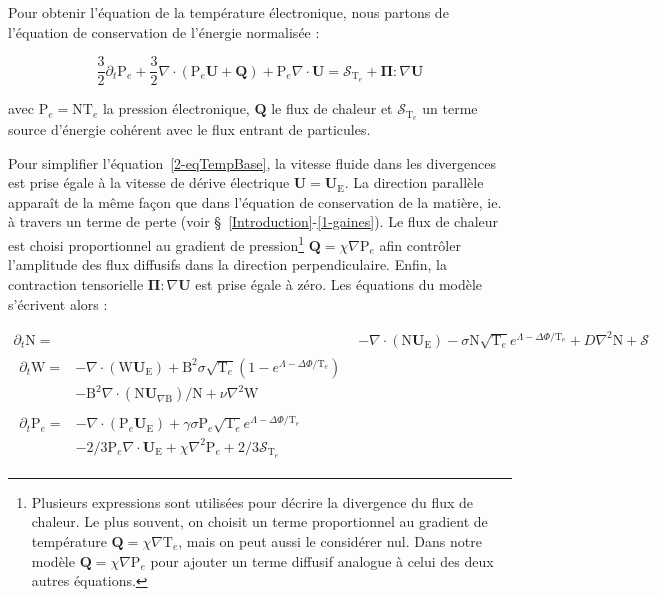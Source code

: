 \begin{refsection}
	Pour obtenir l'équation de la température électronique, nous partons de
	l'équation de conservation de l'énergie normalisée :
	
	\begin{equation} 
	\label{2-eqTempBase}
		\frac{3}{2}\partial_t \text{P}_e +
		\frac{3}{2}\nabla\cdot\left(\text{P}_e\mathbf{U}+\mathbf{Q}\right) +
		\text{P}_e\nabla\cdot\mathbf{U}=\mathcal{S}_{\text{T}_e} +
		\mathbf{\Pi}:\nabla \mathbf U
	\end{equation}
	
	avec $\text{P}_e=\text{NT}_e$ la pression électronique, $\mathbf{Q}$ le
	flux de chaleur et $\mathcal{S}_{\text{T}_e}$ un terme source d'énergie
	cohérent avec le flux entrant de particules. 
	
	Pour simplifier l'équation~\ref{2-eqTempBase}, la vitesse
	fluide dans les divergences est prise égale à la vitesse de dérive électrique $\mathbf
	U=\mathbf U_\text{E}$. La direction parallèle apparaît de la même façon que
	dans l'équation de conservation de la matière, ie. à travers un terme de
	perte (voir \S~\ref{Introduction}-\ref{1-gaines}). Le flux de chaleur est
	choisi proportionnel au gradient de pression\footnote{Plusieurs expressions
	sont utilisées pour décrire la divergence du flux de chaleur. Le plus souvent,
	on choisit un terme proportionnel au gradient de température 
$\mathbf{Q}=\chi\nabla\text{T}_e$, mais on peut aussi le considérer nul. Dans
notre modèle $\mathbf{Q}=\chi\nabla\text{P}_e$ pour ajouter un terme diffusif
analogue à celui des deux autres équations.} $\mathbf{Q}=\chi\nabla\text{P}_e$
afin contrôler l'amplitude des flux diffusifs dans la direction perpendiculaire.
	Enfin, la contraction tensorielle $\mathbf{\Pi}:\nabla \mathbf U$ est
	prise égale à zéro. Les équations du modèle s'écrivent alors :
	
\begin{align}
\label{2-eqContinuiteTemp}
\partial_t \text{N}
=& - \nabla\cdot\left(\text{N}\mathbf U_\text{E}\right) -\sigma
\text{N}\sqrt{\text{T}_e}e^{\Lambda-\Delta\Phi/\text{T}_e} + D\nabla^2 \text{N}
+ \mathcal{S}
\\[0.5cm]
\label{2-eqCourantTemp}
\begin{split}
\partial_{t}\text{W} =& 
-\nabla\cdot\left(\text{W}\mathbf U_\text{E}\right)
+\text{B}^2\sigma\sqrt{\text{T}_e}\left(1-e^{\Lambda-\Delta\Phi/\text{T}_e}\right)\\
&-\text{B}^2\nabla\cdot\left(\text{N}\mathbf
U_{\nabla\text{B}}\right)/\text{N} +\nu\nabla^2\text{W}
\end{split}
\\[0.5cm]
\label{2-eqEnergyTemp}
\begin{split}
\partial_{t}\text{P}_e=&
-\nabla\cdot\left(\text{P}_e\mathbf U_\text{E}\right)
+\gamma\sigma\text{P}_e\sqrt{\text{T}_e}e^{\Lambda-\Delta\Phi/\text{T}_e}\\
&-2/3\text{P}_e\nabla\cdot\mathbf U_\text{E}
+\chi\nabla^2\text{P}_e
+2/3\mathcal{S}_{\text{T}_e}
\end{split}
\end{align}


\end{refsection}
